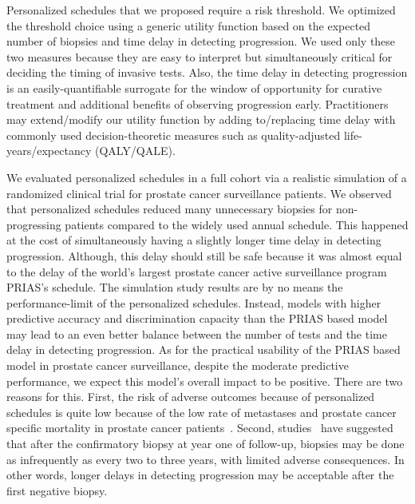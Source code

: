 Personalized schedules that we proposed require a risk threshold. We optimized the threshold choice using a generic utility function based on the expected number of biopsies and time delay in detecting progression. We used only these two measures because they are easy to interpret but simultaneously critical for deciding the timing of invasive tests. Also, the time delay in detecting progression is an easily-quantifiable surrogate for the window of opportunity for curative treatment and additional benefits of observing progression early. Practitioners may extend/modify our utility function by adding to/replacing time delay with commonly used decision-theoretic measures such as quality-adjusted life-years/expectancy (QALY/QALE).

We evaluated personalized schedules in a full cohort via a realistic simulation of a randomized clinical trial for prostate cancer surveillance patients. We observed that personalized schedules reduced many unnecessary biopsies for non-progressing patients compared to the widely used annual schedule. This happened at the cost of simultaneously having a slightly longer time delay in detecting progression. Although, this delay should still be safe because it was almost equal to the delay of the world's largest prostate cancer active surveillance program PRIAS's schedule. The simulation study results are by no means the performance-limit of the personalized schedules. Instead, models with higher predictive accuracy and discrimination capacity than the PRIAS based model may lead to an even better balance between the number of tests and the time delay in detecting progression. As for the practical usability of the PRIAS based model in prostate cancer surveillance, despite the moderate predictive performance, we expect this model's overall impact to be positive. There are two reasons for this. First, the risk of adverse outcomes because of personalized schedules is quite low because of the low rate of metastases and prostate cancer specific mortality in prostate cancer patients~\citep{bokhorst2015compliance}. Second, studies~\citep{carvalho,inoue2018comparative} have suggested that after the confirmatory biopsy at year one of follow-up, biopsies may be done as infrequently as every two to three years, with limited adverse consequences. In other words, longer delays in detecting progression may be acceptable after the first negative biopsy.

